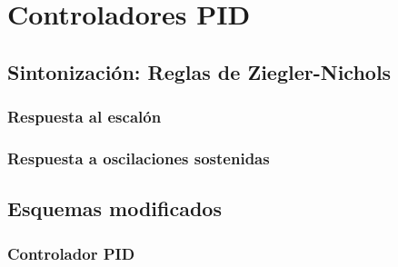
\chapter{Controladores PID}


    \section{Sintonización: Reglas de Ziegler-Nichols}


        \subsection{Respuesta al escalón}


        \subsection{Respuesta a oscilaciones sostenidas}


    \section{Esquemas modificados}


        \subsection{Controlador PID}

